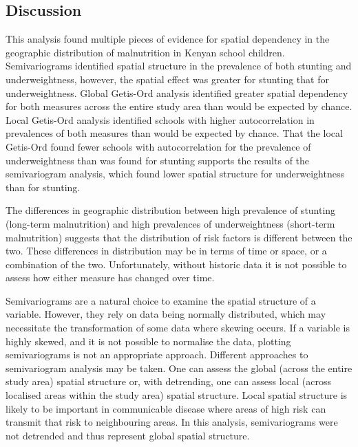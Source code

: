 \documentclass[11pt,a4paper,twoside]{article}\usepackage[]{graphicx}\usepackage[]{color}
\begin{document}
\subsection{Discussion}
This analysis found multiple pieces of evidence for spatial dependency in the geographic distribution of malnutrition in Kenyan school children. 
Semivariograms identified spatial structure in the prevalence of both stunting and underweightness, however, the spatial effect was greater for stunting that for underweightness. 
Global Getis-Ord analysis identified greater spatial dependency for both measures across the entire study area than would be expected by chance. 
Local Getis-Ord analysis identified schools with higher autocorrelation in prevalences of both measures than would be expected by chance.
That the local Getis-Ord found fewer schools with autocorrelation for the prevalence of underweightness than was found for stunting supports the results of the semivariogram analysis, which found lower spatial structure for underweightness than for stunting. 

The differences in geographic distribution between high prevalence of stunting (long-term malnutrition) and high prevalences of underweightness (short-term malnutrition) suggests that the distribution of risk factors is different between the two. 
These differences in distribution may be in terms of time or space, or a combination of the two. 
Unfortunately, without historic data it is not possible to assess how either measure has changed over time. 

Semivariograms are a natural choice to examine the spatial structure of a variable.
However, they rely on data being normally distributed, which may necessitate the transformation of some data where skewing occurs. 
If a variable is highly skewed, and it is not possible to normalise the data, plotting semivariograms is not an appropriate approach. 
Different approaches to semivariogram analysis may be taken. 
One can assess the global (across the entire study area) spatial structure or, with detrending, one can assess local (across localised areas within the study area) spatial structure. \cite{Pullan2012}
Local spatial structure is likely to be important in communicable disease where areas of high risk can transmit that risk to neighbouring areas. 
In this analysis, semivariograms were not detrended and thus represent global spatial structure. 
\end{document}
